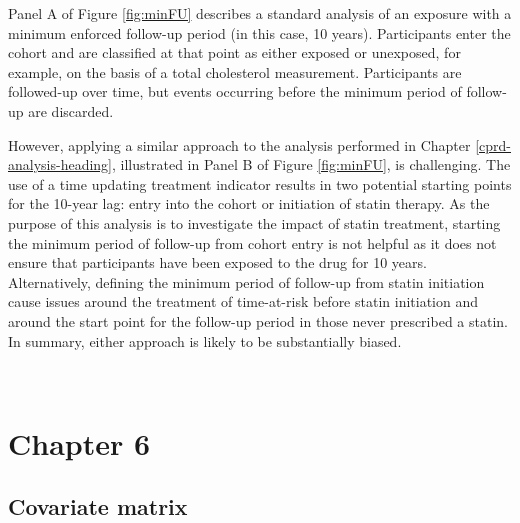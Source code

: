 \documentclass[a4paper, twoside]{templates/ociamthesis}
\begin{document}
Panel A of Figure \ref{fig:minFU} describes a standard analysis of an exposure with a minimum enforced follow-up period (in this case, 10 years). Participants enter the cohort and are classified at that point as either exposed or unexposed, for example, on the basis of a total cholesterol measurement. Participants are followed-up over time, but events occurring before the minimum period of follow-up are discarded.

However, applying a similar approach to the analysis performed in Chapter \ref{cprd-analysis-heading}, illustrated in Panel B of Figure \ref{fig:minFU}, is challenging. The use of a time updating treatment indicator results in two potential starting points for the 10-year lag: entry into the cohort or initiation of statin therapy. As the purpose of this analysis is to investigate the impact of statin treatment, starting the minimum period of follow-up from cohort entry is not helpful as it does not ensure that participants have been exposed to the drug for 10 years. Alternatively, defining the minimum period of follow-up from statin initiation cause issues around the treatment of time-at-risk before statin initiation and around the start point for the follow-up period in those never prescribed a statin. In summary, either approach is likely to be substantially biased.

~

\hypertarget{appendix-ipd-analysis}{%
\section{Chapter 6}\label{appendix-ipd-analysis}}

\hypertarget{appendix-ipd-covariate-matrix}{%
\subsection{Covariate matrix}\label{appendix-ipd-covariate-matrix}}
\end{document}

